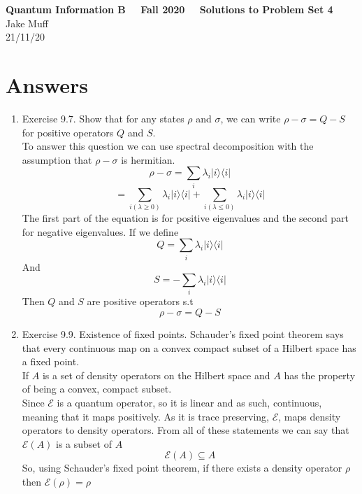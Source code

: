 \documentclass[12pt]{article}
\newcommand{\ket}[1]{\vert{#1}\rangle}
\newcommand{\bra}[1]{\langle{#1}\vert}
\begin{document}
\normalsize

\baselineskip 14pt

\begin{center}
{\Large {\bf Quantum Information B \ \ Fall 2020 \ \  Solutions to Problem Set 4}} \\
Jake Muff \\
21/11/20
\end{center}

\bigskip
\section{Answers}

\begin{enumerate}
    \item Exercise 9.7. Show that for any states $\rho$ and $\sigma$, we can write $\rho - \sigma = Q-S$ for positive operators $Q$ and $S$. 
    \\
    To answer this question we can use spectral decomposition with the assumption that $\rho - \sigma$ is hermitian.
    $$ \rho - \sigma = \sum_i \lambda_i \ket{i} \bra{i} $$
    $$ = \sum_{i (\lambda \geq 0)} \lambda_i \ket{i} \bra{i} + \sum_{i ( \lambda \leq 0)} \lambda_i \ket{i} \bra{i} $$
    The first part of the equation is for positive eigenvalues and the second part for negative eigenvalues. If we define 
    $$ Q = \sum_i \lambda_i \ket{i} \bra{i} $$
    And 
    $$ S = - \sum_i \lambda_i \ket{i} \bra{i} $$
    Then $Q$ and $S$ are positive operators s.t 
    $$ \rho - \sigma = Q-S $$ 

    \item Exercise 9.9. Existence of fixed points. Schauder's fixed point theorem says that every continuous map on a convex compact subset of a Hilbert space has a fixed point. 
    \\
    If $A$ is a set of density operators on the Hilbert space and $A$ has the property of being a convex, compact subset. 
    \\
    Since $\mathcal{E}$ is a quantum operator, so it is linear and as such, continuous, meaning that it maps positively. As it is trace preserving, $\mathcal{E}$, maps density operators to density operators. From all of these statements we can say that $\mathcal{E} (A)$ is a subset of $A$
    $$ \mathcal{E} (A) \subseteq A $$
    So, using Schauder's fixed point theorem, if there exists a density operator $\rho$ then $\mathcal{E} (\rho) = \rho $


\end{enumerate}
\end{document}
